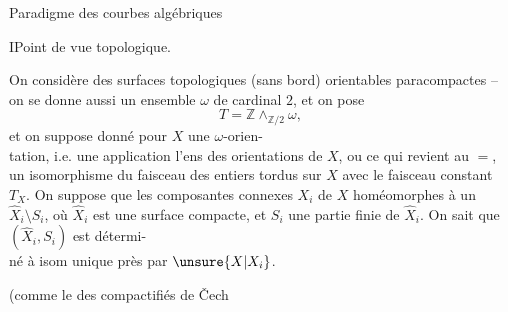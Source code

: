 Paradigme des courbes algébriques

I\quad Point de vue topologique.

On considère des surfaces topologiques (sans bord) orientables paracompactes  -- on se donne aussi un ensemble $\omega$ de cardinal $2$, et on pose
\[
T=\mathbb Z\wedge_{\mathbb Z/2}\omega,
\]
et on suppose donné pour $X$ une $\omega$-orien-\\
tation, i.e. une application  l'ens des orientations de $X$, ou ce qui revient au $=$, un isomorphisme du faisceau des entiers tordus sur $X$ avec le faisceau constant $T_X$. On suppose que les composantes connexes $X_i$ de $X$  homéomorphes à un $\widehat X_i\setminus S_i$, où $\widehat X_i$ est une surface compacte, et $S_i$ une partie finie de $\widehat X_i$. On sait que $(\widehat X_i,S_i)$ est détermi-\\
né à isom unique près par $\unsure{X|X_i}$.

(comme le  des compactifiés de Čech
